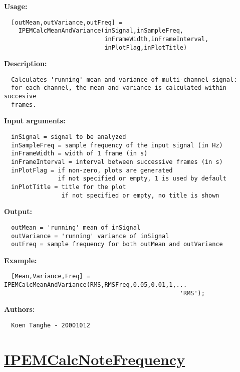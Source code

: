 \textbf{Usage:}
\begin{verbatim}  [outMean,outVariance,outFreq] = 
    IPEMCalcMeanAndVariance(inSignal,inSampleFreq,
                            inFrameWidth,inFrameInterval,
                            inPlotFlag,inPlotTitle)

\end{verbatim}
\textbf{Description:}
\begin{verbatim}  Calculates 'running' mean and variance of multi-channel signal:
  for each channel, the mean and variance is calculated within succesive
  frames.

\end{verbatim}
\textbf{Input arguments:}
\begin{verbatim}  inSignal = signal to be analyzed
  inSampleFreq = sample frequency of the input signal (in Hz)
  inFrameWidth = width of 1 frame (in s)
  inFrameInterval = interval between successive frames (in s)
  inPlotFlag = if non-zero, plots are generated
               if not specified or empty, 1 is used by default
  inPlotTitle = title for the plot
                if not specified or empty, no title is shown

\end{verbatim}
\textbf{Output:}
\begin{verbatim}  outMean = 'running' mean of inSignal
  outVariance = 'running' variance of inSignal
  outFreq = sample frequency for both outMean and outVariance

\end{verbatim}
\textbf{Example:}
\begin{verbatim}  [Mean,Variance,Freq] = IPEMCalcMeanAndVariance(RMS,RMSFreq,0.05,0.01,1,...
                                                 'RMS');

\end{verbatim}
\textbf{Authors:}
\begin{verbatim}  Koen Tanghe - 20001012
\end{verbatim}


\newpage
\section*{\hyperlink{Concepts:IPEMCalcNoteFrequency}{IPEMCalcNoteFrequency}}
\hypertarget{FuncRef:IPEMCalcNoteFrequency}{}

